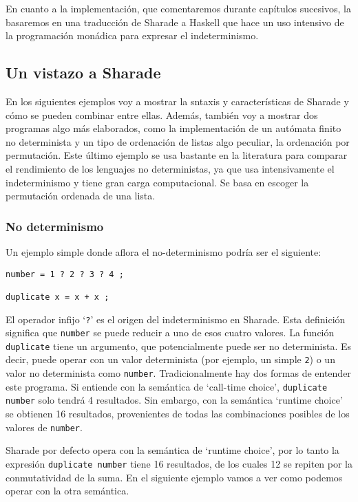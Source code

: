 \documentclass[class=article, crop=false]{standalone}
\begin{document}
En cuanto a la implementación, que comentaremos durante capítulos sucesivos, la basaremos en
una traducción de Sharade a Haskell que hace un uso intensivo de la programación monádica
para expresar el indeterminismo.

\subsection{Un vistazo a Sharade}

En los siguientes ejemplos voy a mostrar la sntaxis y características de Sharade y cómo se
pueden combinar entre ellas. Además, también voy a mostrar dos programas algo más elaborados,
como la implementación de un autómata finito no determinista y un tipo de ordenación de
listas algo peculiar, la ordenación por permutación. Este último ejemplo se usa bastante en
la literatura para comparar el rendimiento de los lenguajes no deterministas, ya que usa
intensivamente el indeterminismo y tiene gran carga computacional. Se basa en escoger la
permutación ordenada de una lista.

\subsubsection{No determinismo}

Un ejemplo simple donde aflora el no-determinismo podría ser el siguiente:

\begin{verbatim}
number = 1 ? 2 ? 3 ? 4 ;

duplicate x = x + x ;
\end{verbatim}

El operador infijo `\verb`?`' es el origen del indeterminismo en Sharade. Esta definición
significa que \verb`number` se puede reducir a uno de esos cuatro valores. La función
\verb`duplicate` tiene un argumento, que potencialmente puede ser no determinista. Es decir,
puede operar con un valor determinista (por ejemplo, un simple \verb`2`) o un valor no
determinista como \verb`number`. Tradicionalmente hay dos formas de entender este programa.
Si entiende con la semántica de `call-time choice', \verb`duplicate number` solo tendrá 4
resultados. Sin embargo, con la semántica `runtime choice' se obtienen 16 resultados,
provenientes de todas las combinaciones posibles de los valores de \verb`number`.

Sharade por defecto opera con la semántica de `runtime choice', por lo tanto la expresión
\verb`duplicate number` tiene 16 resultados, de los cuales 12 se repiten por la
conmutatividad de la suma. En el siguiente ejemplo vamos a ver como podemos operar con la
otra semántica.
\end{document}
